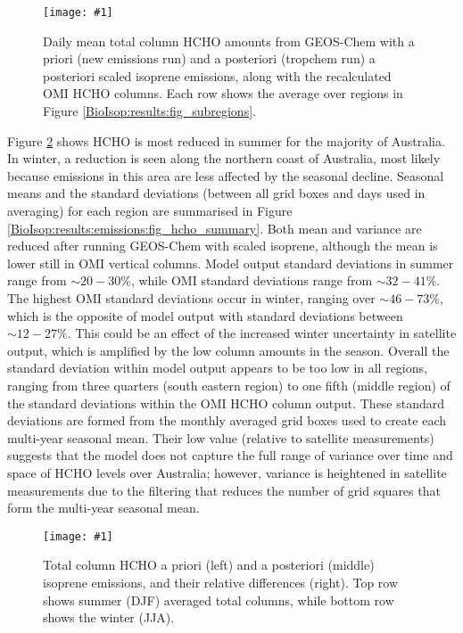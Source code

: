 \documentclass[acp, manuscript]{copernicus}
\newcommand{\mypic}[3]{%
  \begin{figure}
    \texttt{[image: \#1]}
    \caption{#2}
    #3
  \end{figure}
}
\begin{document}
      
      \mypic{Figures/new_emiss/HCHO_total_columns_20050101_20050228.png}{%
        Daily mean total column HCHO amounts from GEOS-Chem with a priori (new emissions run) and a posteriori (tropchem run) a posteriori scaled isoprene emissions, along with the recalculated OMI HCHO columns.
        Each row shows the average over regions in Figure \ref{BioIsop:results:fig_subregions}. }{\label{BioIsop:results:emissions:fig_prelim_new_emiss_HCHO}}
      
      
      Figure \ref{BioIsop:results:emissions:fig_hcho_reduction} shows HCHO is most reduced in summer for the majority of Australia.
      In winter, a reduction is seen along the northern coast of Australia, most likely because emissions in this area are less affected by the seasonal decline.
      Seasonal means and the standard deviations (between all grid boxes and days used in averaging) for each region are summarised in Figure \ref{BioIsop:results:emissions:fig_hcho_summary}.
      Both mean and variance are reduced after running GEOS-Chem with scaled isoprene, although the mean is lower still in OMI vertical columns.
      Model output standard deviations in summer range from $\sim{20-30}\%$, while OMI standard deviations range from $\sim{32-41}\%$.
      The highest OMI standard deviations occur in winter, ranging over $\sim{46-73}\%$, which is the opposite of model output with standard deviations between $\sim{12-27}\%$.
      This could be an effect of the increased winter uncertainty in satellite output, which is amplified by the low column amounts in the season.
      Overall the standard deviation within model output appears to be too low in all regions, ranging from three quarters (south eastern region) to one fifth (middle region) of the standard deviations within the OMI HCHO column output.
      These standard deviations are formed from the monthly averaged grid boxes used to create each multi-year seasonal mean.
      Their low value (relative to satellite measurements) suggests that the model does not capture the full range of variance over time and space of HCHO levels over Australia; however, variance is heightened in satellite measurements due to the filtering that reduces the number of grid squares that form the multi-year seasonal mean.
      
      
      \mypic{Figures/new_emiss/HCHO_total_columns_seasonal.png}{%
        Total column HCHO a priori (left) and a posteriori (middle) isoprene emissions, and their relative differences (right).
        Top row shows summer (DJF) averaged total columns, while bottom row shows the winter (JJA).
      }{\label{BioIsop:results:emissions:fig_hcho_reduction}}
      
\end{document}
